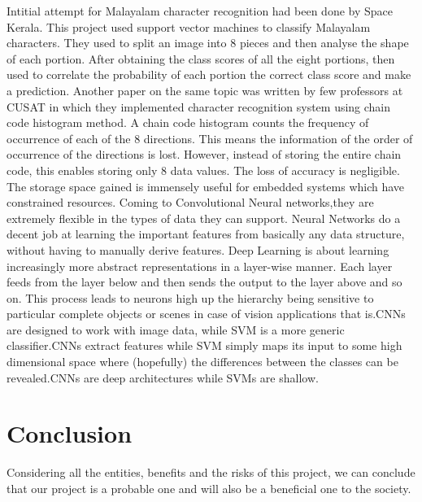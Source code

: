 \documentclass[12pt]{report}
\begin{document}
Intitial attempt for Malayalam character recognition had been done by Space Kerala. This project used support vector machines to classify Malayalam characters. They used to split an image into 8 pieces and then analyse the shape of each portion. After obtaining the class scores of all the eight portions, then used to correlate the probability of each portion the correct class score and make a prediction. Another paper on the same topic was written by few professors at CUSAT in which they implemented character recognition system using chain code histogram method. 
A chain code histogram counts the frequency of occurrence of each of the 8 directions. This means the information of the order of occurrence of the directions is lost. However, instead of storing the entire chain code, this enables storing only 8 data values.
The loss of accuracy is negligible. The storage space gained is immensely useful for embedded systems which have constrained resources. Coming to Convolutional Neural networks,they are extremely flexible in the types of data they can support. Neural Networks do a decent job at learning the important features from basically any data structure, without having to manually derive features. Deep Learning is about learning increasingly more abstract representations in a layer-wise manner. Each layer feeds from the layer below and then sends the output to the layer above and so on. This process leads to neurons high up the hierarchy being sensitive to particular complete objects or scenes in case of vision applications that is.CNNs are designed to work with image data, while SVM is a more generic classifier.CNNs extract features while SVM simply maps its input to some high dimensional space where (hopefully) the differences between the classes can be revealed.CNNs are deep architectures while SVMs are shallow.



\section*{Conclusion}


 Considering all the entities, benefits and the risks of this project, we can conclude that our project is a probable one and will also be a beneficial one to the society.
\end{document}
